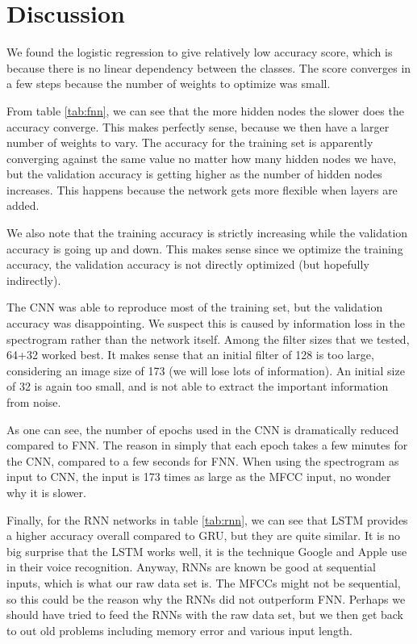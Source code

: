 \section{Discussion} \label{sec:discussion}
We found the logistic regression to give relatively low accuracy score, which is because there is no linear dependency between the classes. The score converges in a few steps because the number of weights to optimize was small. 

From table \eqref{tab:fnn}, we can see that the more hidden nodes the slower does the accuracy converge. This makes perfectly sense, because we then have a larger number of weights to vary. The accuracy for the training set is apparently converging against the same value no matter how many hidden nodes we have, but the validation accuracy is getting higher as the number of hidden nodes increases. This happens because the network gets more flexible when layers are added. 

We also note that the training accuracy is strictly increasing while the validation accuracy is going up and down. This makes sense since we optimize the training accuracy, the validation accuracy is not directly optimized (but hopefully indirectly). 

The CNN was able to reproduce most of the training set, but the validation accuracy was disappointing. We suspect this is caused by information loss in the spectrogram rather than the network itself. Among the filter sizes that we tested, 64+32 worked best. It makes sense that an initial filter of 128 is too large, considering an image size of 173 (we will lose lots of information). An initial size of 32 is again too small, and is not able to extract the important information from noise. 

As one can see, the number of epochs used in the CNN is dramatically reduced compared to FNN. The reason in simply that each epoch takes a few minutes for the CNN, compared to a few seconds for FNN. When using the spectrogram as input to CNN, the input is 173 times as large as the MFCC input, no wonder why it is slower. 

Finally, for the RNN networks in table \eqref{tab:rnn}, we can see that LSTM provides a higher accuracy overall compared to GRU, but they are quite similar. It is no big surprise that the LSTM works well, it is the technique Google and Apple use in their voice recognition. Anyway, RNNs are known be good at sequential inputs, which is what our raw data set is. The MFCCs might not be sequential, so this could be the reason why the RNNs did not outperform FNN. Perhaps we should have tried to feed the RNNs with the raw data set, but we then get back to out old problems including memory error and various input length. 

